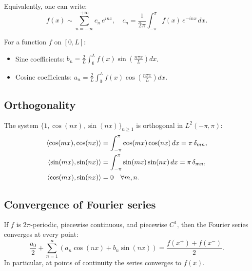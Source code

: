 \begin{definition}
Equivalently, one can write:
\[
    f(x) \sim \sum_{n=-\infty}^{+\infty} c_n\, e^{inx}, \quad
    c_n = \frac{1}{2\pi}\int_{-\pi}^{\pi} f(x)\, e^{-inx}\, dx.
\]
\end{definition}

\begin{keyformulas}[title=\textbf{Fourier coefficients on $[0,L]$}]
For a function $f$ on $[0,L]$:
\begin{itemize}
    \item Sine coefficients: $b_n = \frac{2}{L}\int_0^L f(x)\sin\!\left(\frac{n\pi x}{L}\right) dx$.
    \item Cosine coefficients: $a_n = \frac{2}{L}\int_0^L f(x)\cos\!\left(\frac{n\pi x}{L}\right) dx$.
\end{itemize}
\end{keyformulas}

\subsection{Orthogonality}

\begin{proposition}
The system $\{1, \cos(nx), \sin(nx)\}_{n \geq 1}$ is orthogonal in
$L^2(-\pi, \pi)$:
\begin{align*}
    \langle \cos(mx), \cos(nx) \rangle &= \int_{-\pi}^{\pi} \cos(mx)\cos(nx)\, dx
    = \pi\, \delta_{mn}, \\
    \langle \sin(mx), \sin(nx) \rangle &= \int_{-\pi}^{\pi} \sin(mx)\sin(nx)\, dx
    = \pi\, \delta_{mn}, \\
    \langle \cos(mx), \sin(nx) \rangle &= 0 \quad \forall m, n.
\end{align*}
\end{proposition}

\subsection{Convergence of Fourier series}

\begin{theorem}
If $f$ is $2\pi$-periodic, piecewise continuous, and piecewise $C^1$,
then the Fourier series converges at every point:
\[
    \frac{a_0}{2} + \sum_{n=1}^{\infty} (a_n \cos(nx) + b_n \sin(nx))
    = \frac{f(x^+) + f(x^-)}{2}.
\]
In particular, at points of continuity the series converges to $f(x)$.
\end{theorem}

